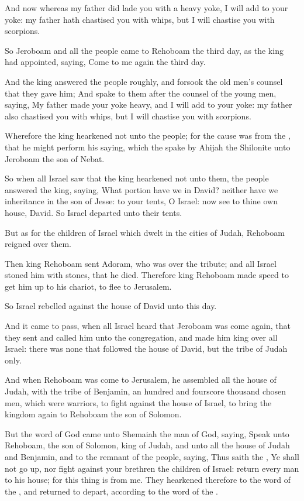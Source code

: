 \Verse And now whereas my father did lade you with a heavy yoke, I will add to your yoke: my father hath chastised you with whips, but I will chastise you with scorpions.

\Verse So Jeroboam and all the people came to Rehoboam the third day, as the king had appointed, saying, Come to me again the third day.

\Verse And the king answered the people roughly, and forsook the old men's counsel that they gave him; \Verse And spake to them after the counsel of the young men, saying, My father made your yoke heavy, and I will add to your yoke: my father also chastised you with whips, but I will chastise you with scorpions.

\Verse Wherefore the king hearkened not unto the people; for the cause was from the \LORD, that he might perform his saying, which the \LORD spake by Ahijah the Shilonite unto Jeroboam the son of Nebat.

\Verse So when all Israel saw that the king hearkened not unto them, the people answered the king, saying, What portion have we in David?  neither have we inheritance in the son of Jesse: to your tents, O Israel: now see to thine own house, David. So Israel departed unto their tents.

\Verse But as for the children of Israel which dwelt in the cities of Judah, Rehoboam reigned over them.

\Verse Then king Rehoboam sent Adoram, who was over the tribute; and all Israel stoned him with stones, that he died. Therefore king Rehoboam made speed to get him up to his chariot, to flee to Jerusalem.

\Verse So Israel rebelled against the house of David unto this day.

\Verse And it came to pass, when all Israel heard that Jeroboam was come again, that they sent and called him unto the congregation, and made him king over all Israel: there was none that followed the house of David, but the tribe of Judah only.

\Verse And when Rehoboam was come to Jerusalem, he assembled all the house of Judah, with the tribe of Benjamin, an hundred and fourscore thousand chosen men, which were warriors, to fight against the house of Israel, to bring the kingdom again to Rehoboam the son of Solomon.

\Verse But the word of God came unto Shemaiah the man of God, saying, \Verse Speak unto Rehoboam, the son of Solomon, king of Judah, and unto all the house of Judah and Benjamin, and to the remnant of the people, saying, \Verse Thus saith the \LORD, Ye shall not go up, nor fight against your brethren the children of Israel: return every man to his house; for this thing is from me. They hearkened therefore to the word of the \LORD, and returned to depart, according to the word of the \LORD.

